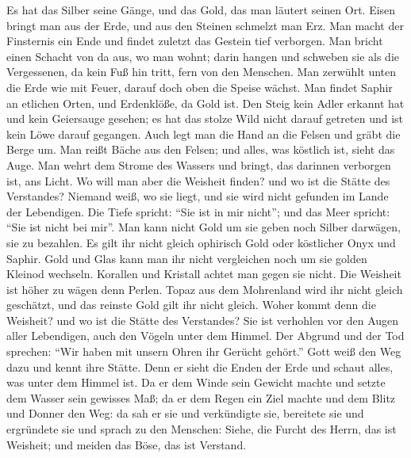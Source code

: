  Es hat das Silber seine Gänge, und das Gold, das man
läutert seinen Ort.  Eisen bringt man aus der Erde, und aus
den Steinen schmelzt man Erz.  Man macht der Finsternis ein
Ende und findet zuletzt das Gestein tief verborgen.  Man
bricht einen Schacht von da aus, wo man wohnt; darin hangen und schweben
sie als die Vergessenen, da kein Fuß hin tritt, fern von den Menschen.
 Man zerwühlt unten die Erde wie mit Feuer, darauf doch oben
die Speise wächst.  Man findet Saphir an etlichen Orten, und
Erdenklöße, da Gold ist.  Den Steig kein Adler erkannt hat
und kein Geiersauge gesehen;  es hat das stolze Wild nicht
darauf getreten und ist kein Löwe darauf gegangen.  Auch
legt man die Hand an die Felsen und gräbt die Berge um. 
Man reißt Bäche aus den Felsen; und alles, was köstlich ist, sieht das
Auge.  Man wehrt dem Strome des Wassers und bringt, das
darinnen verborgen ist, ans Licht.  Wo will man aber die
Weisheit finden? und wo ist die Stätte des Verstandes? 
Niemand weiß, wo sie liegt, und sie wird nicht gefunden im Lande der
Lebendigen.  Die Tiefe spricht: ``Sie ist in mir nicht'';
und das Meer spricht: ``Sie ist nicht bei mir''.  Man kann
nicht Gold um sie geben noch Silber darwägen, sie zu bezahlen.
 Es gilt ihr nicht gleich ophirisch Gold oder köstlicher
Onyx und Saphir.  Gold und Glas kann man ihr nicht
vergleichen noch um sie golden Kleinod wechseln.  Korallen
und Kristall achtet man gegen sie nicht. Die Weisheit ist höher zu wägen
denn Perlen.  Topaz aus dem Mohrenland wird ihr nicht
gleich geschätzt, und das reinste Gold gilt ihr nicht gleich.
 Woher kommt denn die Weisheit? und wo ist die Stätte des
Verstandes?  Sie ist verhohlen vor den Augen aller
Lebendigen, auch den Vögeln unter dem Himmel.  Der Abgrund
und der Tod sprechen: ``Wir haben mit unsern Ohren ihr Gerücht gehört.''
 Gott weiß den Weg dazu und kennt ihre Stätte.
 Denn er sieht die Enden der Erde und schaut alles, was
unter dem Himmel ist.  Da er dem Winde sein Gewicht machte
und setzte dem Wasser sein gewisses Maß;  da er dem Regen
ein Ziel machte und dem Blitz und Donner den Weg:  da sah
er sie und verkündigte sie, bereitete sie und ergründete sie
 und sprach zu den Menschen: Siehe, die Furcht des Herrn,
das ist Weisheit; und meiden das Böse, das ist Verstand.

